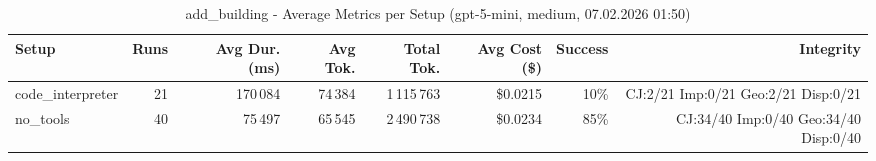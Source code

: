 \documentclass[a4paper,11pt]{article}
\begin{document}
\begin{table}[H]
\centering
\scriptsize
\caption{add\_building - Average Metrics per Setup (gpt-5-mini, medium, 07.02.2026 01:50)}
\label{tab:combined\_add\_building\_metrics\_20260207}
\begin{tabular}{l r r r r r r r}
\toprule
Setup & Runs & Avg Dur. (ms) & Avg Tok. & Total Tok. & Avg Cost (\$) & Success & Integrity \\
\midrule
code\_interpreter & 21 & 170\,084 & 74\,384 & 1\,115\,763 & \$0.0215 & 10\% & CJ:2/21 Imp:0/21 Geo:2/21 Disp:0/21 \\
no\_tools & 40 & 75\,497 & 65\,545 & 2\,490\,738 & \$0.0234 & 85\% & CJ:34/40 Imp:0/40 Geo:34/40 Disp:0/40 \\
\bottomrule
\end{tabular}
\end{table}
\end{document}
